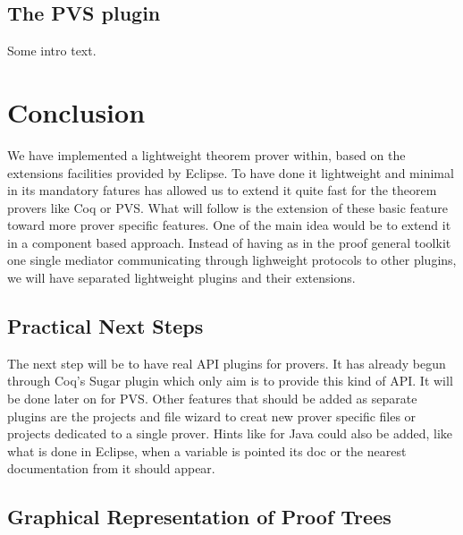 \documentclass{entcs}
\begin{document}
\subsection{The PVS plugin}
\label{subsec:pvs-plugin}

Some intro text.

\section{Conclusion}
\label{sec:conclusion}

We have implemented a lightweight theorem prover within, based on the extensions
facilities provided by Eclipse. To have done it lightweight and minimal in its mandatory
fatures has allowed us to extend it quite fast for the theorem provers like Coq or PVS.
What will follow is the extension of these basic feature toward more prover specific features.
One of the main idea would be to extend it in a component based approach.
Instead of having as in the proof general toolkit one single mediator communicating
through lighweight protocols to other plugins, we will have separated lightweight
plugins and their extensions.

\subsection{Practical Next Steps}
\label{subsec:practical-next-steps}

The next step will be to have real API plugins for provers. It has already begun
through Coq's Sugar plugin which only aim is to provide this kind of API.
It will be done later on for PVS. Other features that should be added
as separate plugins are the projects and file wizard to creat new prover specific
files or projects dedicated to a single prover.
Hints like for Java could also be added, like what is done in Eclipse, when a variable
is pointed its doc or the nearest documentation from it should appear. 


\subsection{Graphical Representation of Proof Trees}
\label{subsec:graph-repr-proof}
\end{document}
